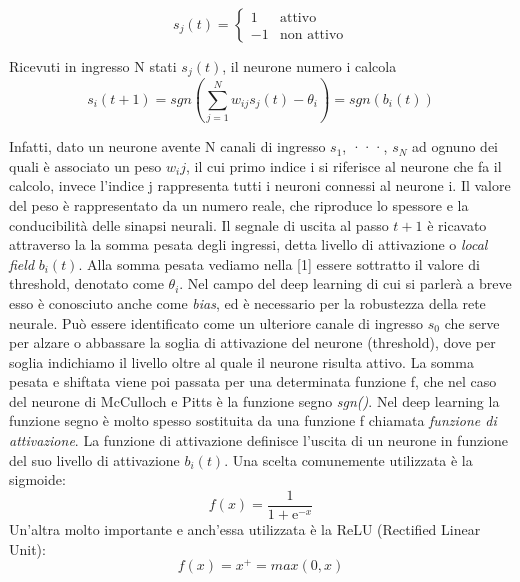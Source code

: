 \[s_j(t) = \left\{\begin{matrix}
    1 & \text{attivo}\\ 
    -1 & \text{non attivo}
    \end{matrix}\right.\]


Ricevuti in ingresso N stati \(s_j(t)\), il neurone numero i calcola 
\begin{equation} \label{1}
s_i(t+1)= sgn(\sum_{j=1}^{N}w_{ij}s_j(t)-\theta_i)= sgn(b_i(t))
\end{equation}

Infatti, dato un neurone avente N canali di ingresso \(s_1\), ···, \(s_N\) ad ognuno dei quali
è associato un peso \(w_ij\), il cui primo indice i si riferisce al neurone che fa il calcolo,
invece l’indice j rappresenta tutti 
i neuroni connessi al neurone i. Il valore del peso è rappresentato da un numero reale, 
che riproduce lo spessore e la conducibilità delle sinapsi neurali.
 Il segnale di uscita al passo \(t+1\) è ricavato attraverso la la somma pesata degli ingressi, 
detta livello di attivazione o \emph{local field} \(b_i(t)\). 
Alla somma pesata vediamo nella [1] essere sottratto il valore di threshold, denotato come \(\theta_i\). 
Nel campo del deep learning di cui si parlerà a breve esso è conosciuto 
anche come \emph{bias}, ed è necessario per la robustezza della rete neurale. Può essere identificato
 come un ulteriore canale di ingresso \(s_0\) che serve per alzare o 
abbassare la soglia di attivazione del neurone (threshold), dove per soglia indichiamo il livello oltre
 al quale il neurone risulta attivo. 
La somma pesata e shiftata viene poi passata per una determinata funzione f, 
che nel caso del neurone di McCulloch e Pitts  è la funzione segno \emph{sgn()}.
Nel deep learning la funzione segno è molto spesso sostituita da una funzione f chiamata
 \emph{funzione di attivazione}. La funzione di attivazione definisce l’uscita di un neurone 
 in funzione del suo livello di attivazione \(b_i(t)\).
Una scelta comunemente utilizzata è la sigmoide: 
\[f(x)= \frac{1}{1+\mathrm{e}^{-x}}\]
Un’altra molto importante e anch’essa utilizzata è la ReLU (Rectified Linear Unit):
\[f(x) = x^{+} = max(0,x)\]

